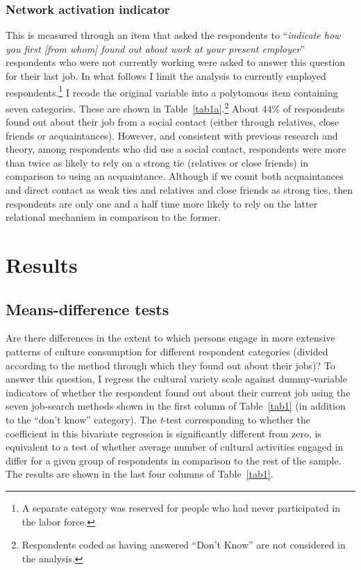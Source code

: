 \documentclass[12pt]{article}
\begin{document}
\subsubsection{Network activation indicator}
This is measured through an item that asked the respondents to ``\emph{indicate how you first [from whom] found out about work at your present employer}'' respondents who were not currently working were asked to answer this question for their last job.  In what follows I limit the analysis to currently employed respondents.\footnote{A separate category was reserved for people who had never participated in the labor force.} I recode the original variable into a polytomous item containing seven categories.  These are shown in Table~\ref{tab1a}.\footnote{Respondents coded as having answered ``Don't Know'' are not considered in the analysis.} About 44\% of respondents found out about their job from a social contact (either through relatives, close friends or acquaintances). However, and consistent with previous research and theory, among respondents who did use a social contact, respondents were more than twice as likely to rely on a strong tie (relatives or close friends) in comparison to using an acquaintance.  Although if we count both acquaintances and direct contact as weak ties and relatives and close friends as strong ties, then respondents are only one and a half time more likely to rely on the latter relational mechanism in comparison to the former.

\section{Results}
\subsection{Means-difference tests}
Are there differences in the extent to which persons engage in more extensive patterns of culture consumption for different respondent categories (divided according to the method through which they found out about their jobs)?  To answer this question, I regress the cultural variety scale against dummy-variable indicators of whether the respondent found out about their current job using the seven job-search methods shown in the first column of Table~\ref{tab1} (in addition to the ``don't know'' category).  The \emph{t}-test corresponding to whether the coefficient in this bivariate regression is significantly different from zero, is equivalent to a test of whether average number of cultural activities engaged in differ for a given group of respondents in comparison to the rest of the sample.  The results are shown in the last four columns of Table~\ref{tab1}.
\end{document}
